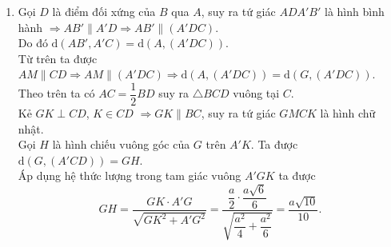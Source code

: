 \begin{bt}
{\begin{enumerate}
	\[
	V_{ABC.A'B'C'}= \dfrac{a^2\sqrt{3}}{4} \cdot \dfrac{a\sqrt{6}}{6}= \dfrac{a^3\sqrt{2}}{8}.
	\]
	\item Gọi $D$ là điểm đối xứng của $B$ qua $A$, suy ra tứ giác $ADA'B'$ là hình bình hành $\Rightarrow AB' \parallel A'D \Rightarrow AB' \parallel (A'DC)$.\\
	Do đó $\mathrm{d} (AB', A'C)= \mathrm{d} (A, (A'DC))$.\\
	Từ trên ta được $AM \parallel CD \Rightarrow AM \parallel (A'DC) \Rightarrow \mathrm{d} (A, (A'DC))= \mathrm{d}(G, (A'DC))$.\\
	Theo trên ta có $AC= \dfrac{1}{2}{BD}$ suy ra $\triangle BCD$ vuông tại $C$.\\
	Kẻ $GK \perp CD$, $K \in CD$ $\Rightarrow GK \parallel BC$, suy ra tứ giác $GMCK$ là hình chữ nhật.\\
	Gọi $H$ là hình chiếu vuông góc của $G$ trên $A'K$. Ta được $\mathrm{d}(G, (A'CD))=GH$.\\
	Áp dụng hệ thức lượng trong tam giác vuông $A'GK$ ta được
	\[
	GH= \dfrac{GK \cdot A'G}{\sqrt{GK^2+A'G^2}} = \dfrac{\dfrac{a}{2} \cdot \dfrac{a\sqrt{6}}{6}}{\sqrt{\dfrac{a^2}{4}+\dfrac{a^2}{6}}}= \dfrac{a\sqrt{10}}{10}.
	\]
\end{enumerate}
}
\end{bt}

